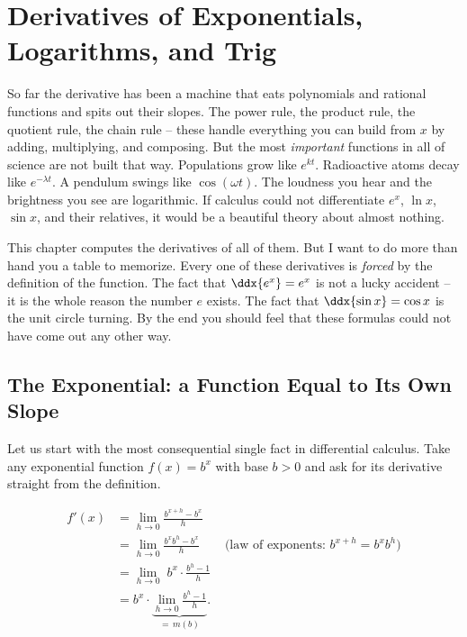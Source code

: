 \chapter{Derivatives of Exponentials, Logarithms, and Trig}

So far the derivative has been a machine that eats polynomials and rational
functions and spits out their slopes. The power rule, the product rule, the
quotient rule, the chain rule -- these handle everything you can build from
$x$ by adding, multiplying, and composing. But the most \emph{important}
functions in all of science are not built that way. Populations grow like
$e^{kt}$. Radioactive atoms decay like $e^{-\lambda t}$. A pendulum swings
like $\cos(\omega t)$. The loudness you hear and the brightness you see are
logarithmic. If calculus could not differentiate $e^x$, $\ln x$, $\sin x$,
and their relatives, it would be a beautiful theory about almost nothing.

This chapter computes the derivatives of all of them. But I want to do more
than hand you a table to memorize. Every one of these derivatives is
\emph{forced} by the definition of the function. The fact that
$\ddx{e^x} = e^x$ is not a lucky accident -- it is the whole reason the
number $e$ exists. The fact that $\ddx{\sin x} = \cos x$ is the unit circle
turning. By the end you should feel that these formulas could not have come
out any other way.

\chapterline

\section{The Exponential: a Function Equal to Its Own Slope}
\label{ch12:exp-intro}

Let us start with the most consequential single fact in differential
calculus. Take any exponential function $f(x) = b^x$ with base $b > 0$ and
ask for its derivative straight from the definition.

\begin{align*}
f'(x)
&= \lim_{h \to 0} \frac{b^{x+h} - b^x}{h} \\[2pt]
&= \lim_{h \to 0} \frac{b^x b^h - b^x}{h}
   \qquad\text{(law of exponents: } b^{x+h}=b^x b^h\text{)}\\[2pt]
&= \lim_{h \to 0}\; b^x \cdot \frac{b^h - 1}{h} \\[2pt]
&= b^x \cdot \underbrace{\lim_{h \to 0} \frac{b^h - 1}{h}}_{\textstyle =\, m(b)}.
\end{align*}

